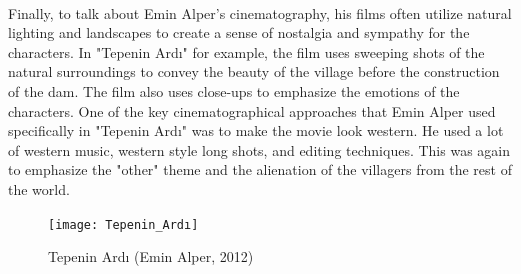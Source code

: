 \documentclass[12pt]{article}
\begin{document}
\\
Finally, to talk about Emin Alper's cinematography, his films often utilize natural lighting and landscapes to create a sense of nostalgia and sympathy for the characters.
In "Tepenin Ardı" for example, the film uses sweeping shots of the natural surroundings to convey the beauty of the village before the construction of the dam. The film also uses close-ups to emphasize the emotions of the characters.
One of the key cinematographical approaches that Emin Alper used specifically in "Tepenin Ardı" was to make the movie look western. He used a lot of western music, western style long shots, and editing techniques. This was again to emphasize the "other" theme
and the alienation of the villagers from the rest of the world.
\\

\begin{figure}[h]
        \begin{center}
                \texttt{[image: Tepenin\_Ardı]}
                \caption{Tepenin Ardı (Emin Alper, 2012)}
        \end{center}
\end{figure}

\FloatBarrier
\end{document}
